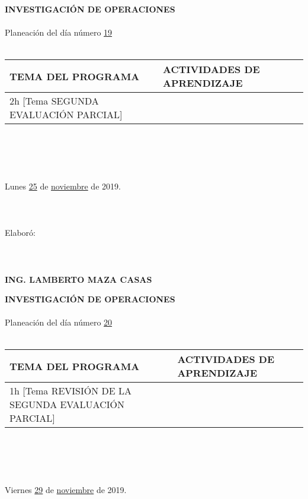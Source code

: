 \documentclass[landscape]{article}
\begin{document}
{\begin{center}
{\bf 
INVESTIGACI\'ON DE OPERACIONES
}
\ \\
\ \\
Planeaci\'on del d\'ia n\'umero \underline{\hspace{0.5cm}19\hspace{0.5cm}}
\ \\
\ \\
\begin{tabular}{|p{11cm}|p{8cm}|}\hline
{\bf TEMA DEL PROGRAMA}&{\bf ACTIVIDADES DE APRENDIZAJE}\\\hline
	2h	[Tema SEGUNDA EVALUACI\'ON PARCIAL]
&\\
\hline
\end{tabular}
\ \\
\ \\
\ \\
\ \\
Lunes \underline{\hspace{0.5cm}25\hspace{0.5cm}} de  \underline{\hspace{0.5cm}noviembre\hspace{0.5cm}} de 2019.
\ \\
\ \\
\ \\
\ \\
Elabor\'o:
\ \\
\ \\
\ \\
\ \\
{\bf ING. LAMBERTO MAZA CASAS}
\end{center}
\eject
\begin{center}
{\bf 
INVESTIGACI\'ON DE OPERACIONES
}
\ \\
\ \\
Planeaci\'on del d\'ia n\'umero \underline{\hspace{0.5cm}20\hspace{0.5cm}}
\ \\
\ \\
\begin{tabular}{|p{11cm}|p{8cm}|}\hline
{\bf TEMA DEL PROGRAMA}&{\bf ACTIVIDADES DE APRENDIZAJE}\\\hline
	1h	[Tema REVISI\'ON DE LA SEGUNDA EVALUACI\'ON PARCIAL]
&\\
\hline
\end{tabular}
\ \\
\ \\
\ \\
\ \\
Viernes \underline{\hspace{0.5cm}29\hspace{0.5cm}} de  \underline{\hspace{0.5cm}noviembre\hspace{0.5cm}} de 2019.

\end{center}}
\end{document}
